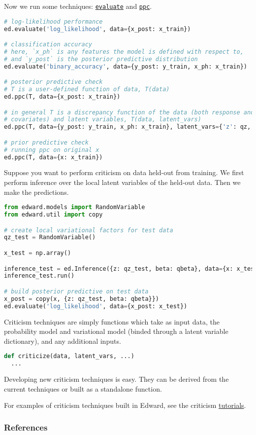 Now we run some techniques:
\href{/tutorials/point-evaluation}{\texttt{evaluate}}
and
\href{/tutorials/ppc}{\texttt{ppc}}.

\begin{lstlisting}[language=Python]
# log-likelihood performance
ed.evaluate('log_likelihood', data={x_post: x_train})

# classification accuracy
# here, `x_ph` is any features the model is defined with respect to,
# and `y_post` is the posterior predictive distribution
ed.evaluate('binary_accuracy', data={y_post: y_train, x_ph: x_train})

# posterior predictive check
# T is a user-defined function of data, T(data)
ed.ppc(T, data={x_post: x_train})

# in general T is a discrepancy function of the data (both response and
# covariates) and latent variables, T(data, latent_vars)
ed.ppc(T, data={y_post: y_train, x_ph: x_train}, latent_vars={'z': qz, 'beta': qbeta})

# prior predictive check
# running ppc on original x
ed.ppc(T, data={x: x_train})
\end{lstlisting}

Suppose you want to perform criticism on data held-out from training.
We first perform inference over the local latent variables of the
held-out data. Then we make the predictions.

\begin{lstlisting}[language=Python]
from edward.models import RandomVariable
from edward.util import copy

# create local variational factors for test data
qz_test = RandomVariable()

x_test = np.array()

inference_test = ed.Inference({z: qz_test, beta: qbeta}, data={x: x_test})
inference_test.run()

# build posterior predictive on test data
x_post = copy(x, {z: qz_test, beta: qbeta}})
ed.evaluate('log_likelihood', data={x_post: x_test})
\end{lstlisting}

Criticism techniques are simply functions which take as input data,
the probability model and variational model (binded through a latent
variable dictionary), and any additional inputs.

\begin{lstlisting}[language=Python]
def criticize(data, latent_vars, ...)
  ...
\end{lstlisting}

Developing new criticism techniques is easy.  They can be derived from
the current techniques or built as a standalone function.

For examples of criticism techniques built in Edward, see the
criticism
\href{/tutorials/}{tutorials}.

\subsubsection{References}\label{references}
